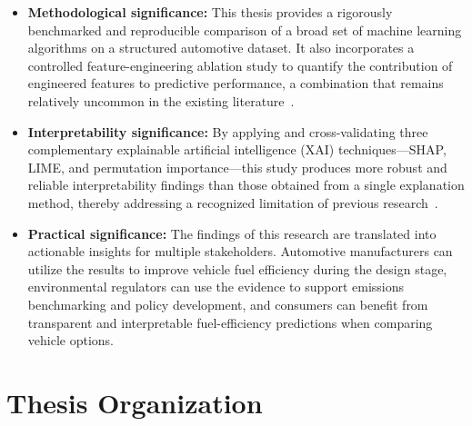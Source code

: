 \begin{itemize}
    \item \textbf{Methodological significance:} This thesis provides a rigorously benchmarked and reproducible comparison of a broad set of machine learning algorithms on a structured automotive dataset. It also incorporates a controlled feature-engineering ablation study to quantify the contribution of engineered features to predictive performance, a combination that remains relatively uncommon in the existing literature~\cite{atique2026explainable}.

    \item \textbf{Interpretability significance:} By applying and cross-validating three complementary explainable artificial intelligence (XAI) techniques---SHAP, LIME, and permutation importance---this study produces more robust and reliable interpretability findings than those obtained from a single explanation method, thereby addressing a recognized limitation of previous research~\cite{atique2026explainable}\cite{mangalathu2020failure}.

    \item \textbf{Practical significance:} The findings of this research are translated into actionable insights for multiple stakeholders. Automotive manufacturers can utilize the results to improve vehicle fuel efficiency during the design stage, environmental regulators can use the evidence to support emissions benchmarking and policy development, and consumers can benefit from transparent and interpretable fuel-efficiency predictions when comparing vehicle options.
\end{itemize}


\section{Thesis Organization}

